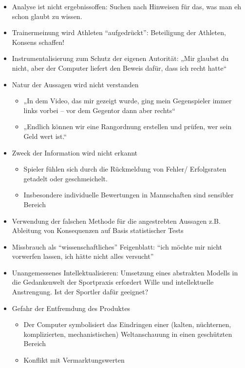 \begin{itemize}
  \item Analyse ist nicht ergebnissoffen: Suchen nach Hinweisen für das, was man eh schon glaubt zu wissen.
  \item Trainermeinung wird Athleten ``aufgedrückt'': Beteiligung der Athleten, Konsens schaffen!
  \item Instrumentalisierung zum Schutz der eigenen Autorität: „Mir glaubst du nicht, aber der Computer liefert den Beweis dafür, dass ich recht hatte“
  \item Natur der Aussagen wird nicht verstanden
    \begin{itemize}
      \item „In dem Video, das mir gezeigt wurde, ging mein Gegenspieler immer links vorbei – vor dem Gegentor dann aber rechts“
      \item „Endlich können wir eine Rangordnung erstellen und prüfen, wer sein Geld wert ist.“
    \end{itemize}
  \item Zweck der Information wird nicht erkannt
    \begin{itemize}
      \item Spieler fühlen sich durch die Rückmeldung von Fehler/ Erfolgsraten getadelt oder geschmeichelt.
      \item Insbesondere individuelle Bewertungen in Mannschaften sind sensibler Bereich
    \end{itemize}
  \item Verwendung der falschen Methode für die angestrebten Aussagen z.B. Ableitung von Konsequenzen auf Basis statistischer Tests
  \item Missbrauch als ``wissenschaftliches'' Feigenblatt: ``ich möchte mir nicht vorwerfen lassen, ich hätte nicht alles versucht''
  \item Unangemessenes Intellektualisieren: Umsetzung eines abstrakten Modells in die Gedankenwelt der Sportpraxis erfordert Wille und intellektuelle Anstrengung. Ist der Sportler dafür geeignet?
  \item Gefahr der Entfremdung des Produktes
  \begin{itemize}
    \item Der Computer symbolisiert das Eindringen einer (kalten, nüchternen, komplizierten, mechanistischen) Weltanschauung in einen geschützten Bereich
    \item Konflikt mit Vermarktungswerten
  \end{itemize}
\end{itemize}

